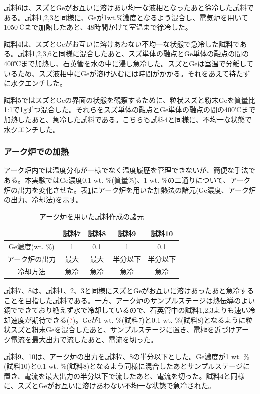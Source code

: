 試料6は、スズとGeがお互いに溶けあい均一な液相となったあと徐冷した試料である。試料1,2,3と同様に、Geが1wt.\%濃度となるよう混合し、電気炉を用いて1050℃まで加熱したあと、48時間かけて室温まで徐冷した。

試料4は、スズとGeがお互いに溶けあわない不均一な状態で急冷した試料である。試料1,2,3,6と同様に混合したあと、スズ単体の融点とGe単体の融点の間の400℃まで加熱し、石英管を水の中に浸し急冷した。スズとGeは室温で分離しているため、スズ液相中にGeが溶け込むには時間がかかる。それをあえて待たずに水クエンチした。

試料5ではスズとGeの界面の状態を観察するために、粒状スズと粉末Geを質量比1:1で1gずつ混合した。それらをスズ単体の融点とGe単体の融点の間の400℃まで加熱したあと、急冷した試料である。こちらも試料4と同様に、不均一な状態で水クエンチした。

\subsubsection{アーク炉での加熱}
アーク炉内では温度分布が一様でなく温度履歴を管理できないが、簡便な手法である。本実験ではGe濃度0.1 wt. \%(質量\%)、1 wt. \%の二通りについて、アーク炉の出力を変化させた。表\ref{tab:sample_prep_arc}にアーク炉を用いた加熱法の諸元(Ge濃度、アーク炉の出力、冷却法)を示す。
\begin{table}[!h]
    \begin{center}
  \begin{tabular}{c|cccc}
    & 試料7 & 試料8 & 試料9 & 試料10 \\ \hline
    Ge濃度(wt. \%)  & 1 & 0.1 &  1 & 0.1  \\
   アーク炉の出力  & 最大& 最大&  半分以下 & 半分以下\\
    冷却方法 & 急冷 & 急冷& 急冷& 急冷 \\
  \end{tabular}
  \caption{アーク炉を用いた試料作成の諸元}
  \label{tab:sample_prep_arc}
    \end{center}
\end{table}

試料7、8は、試料1、2、3と同様にスズとGeがお互いに溶けあったあと急冷することを目指した試料である。一方、アーク炉のサンプルステージは熱伝導のよい銅でできており絶えず水で冷却しているので、石英管中の試料1,2,3よりも速い冷却速度が期待できる(\textcolor{red}{?})。Geが1 wt. \%(試料7)と0.1 wt. \%(試料8)となるように粒状スズと粉末Geを混合したあと、サンプルステージに置き、電極を近づけアーク電流を最大出力で流したあと、電流を切った。

試料9、10は、アーク炉の出力を試料7、8の半分以下とした。Ge濃度が1 wt. \%(試料10)と0.1 wt. \%(試料8)となるよう同様に混合したあとサンプルステージに置き、電流を最大出力の半分以下で流したあと、電流を切った。試料4と同様に、スズとGeがお互いに溶けあわない不均一な状態で急冷された。


